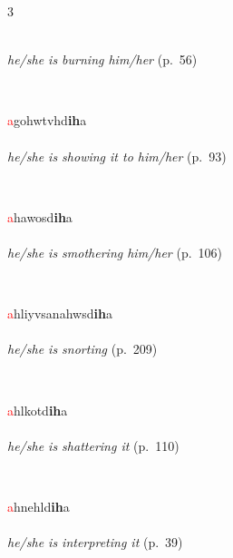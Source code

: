 \documentclass[oneside,openany]{book}%
\begin{document}
\begin{multicols}{3}
\begin{minipage}[t]{\linewidth}
\\
\noindent \textit{he/she is burning him/her} (p.~56)
\end{minipage}\\[1em]%
\begin{minipage}[t]{\linewidth}
\raggedright\noindent \textcolor{Red}{a}gohwtvhd\textbf{ih}a\\
\\
\noindent \textit{he/she is showing it to him/her} (p.~93)
\end{minipage}\\[1em]%
\begin{minipage}[t]{\linewidth}
\raggedright\noindent \textcolor{Red}{a}hawosd\textbf{ih}a\\
\\
\noindent \textit{he/she is smothering him/her} (p.~106)
\end{minipage}\\[1em]%
\begin{minipage}[t]{\linewidth}
\raggedright\noindent \textcolor{Red}{a}hliyvsanahwsd\textbf{ih}a\\
\\
\noindent \textit{he/she is snorting} (p.~209)
\end{minipage}\\[1em]%
\begin{minipage}[t]{\linewidth}
\raggedright\noindent \textcolor{Red}{a}hlkotd\textbf{ih}a\\
\\
\noindent \textit{he/she is shattering it} (p.~110)
\end{minipage}\\[1em]%
\begin{minipage}[t]{\linewidth}
\raggedright\noindent \textcolor{Red}{a}hnehld\textbf{ih}a\\
\\
\noindent \textit{he/she is interpreting it} (p.~39)
\end{minipage}\\[1em]%
\begin{minipage}[t]{\linewidth}

\end{minipage}
\end{multicols}
\end{document}
